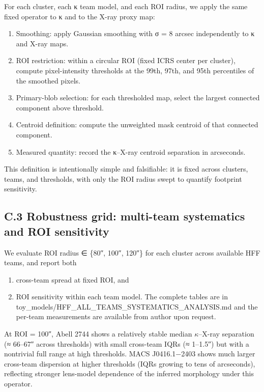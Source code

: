 For each cluster, each κ team model, and each ROI radius, we apply the same fixed operator to κ and to the X-ray proxy map:

\begin{enumerate}
\def\labelenumi{\arabic{enumi})}
\item
  Smoothing: apply Gaussian smoothing with σ = 8 arcsec independently to κ and X-ray maps.
\item
  ROI restriction: within a circular ROI (fixed ICRS center per cluster), compute pixel-intensity thresholds at the 99th, 97th, and 95th percentiles of the smoothed pixels.
\item
  Primary-blob selection: for each thresholded map, select the largest connected component above threshold.
\item
  Centroid definition: compute the unweighted mask centroid of that connected component.
\item
  Measured quantity: record the κ--X-ray centroid separation in arcseconds.
\end{enumerate}

This definition is intentionally simple and falsifiable: it is fixed across clusters, teams, and thresholds, with only the ROI radius swept to quantify footprint sensitivity.

\subsection{C.3 Robustness grid: multi-team systematics and ROI sensitivity}\label{c.3-robustness-grid-multi-team-systematics-and-roi-sensitivity}

We evaluate ROI radius ∈ \{80″, 100″, 120″\} for each cluster across available HFF teams, and report both

\begin{enumerate}
\def\labelenumi{(\roman{enumi})}
\item
  cross-team spread at fixed ROI, and
\item
  ROI sensitivity within each team model. The complete tables are in toy\_models/HFF\_ALL\_TEAMS\_SYSTEMATICS\_ANALYSIS.md and the per-team measurements are available from author upon request.
\end{enumerate}

At ROI = 100″, Abell 2744 shows a relatively stable median \(\kappa\)--X-ray separation (≈ 66--67″ across thresholds) with small cross-team IQRs (≈ 1--1.5″) but with a nontrivial full range at high thresholds. MACS J0416.1−2403 shows much larger cross-team dispersion at higher thresholds (IQRs growing to tens of arcseconds), reflecting stronger lens-model dependence of the inferred morphology under this operator.

